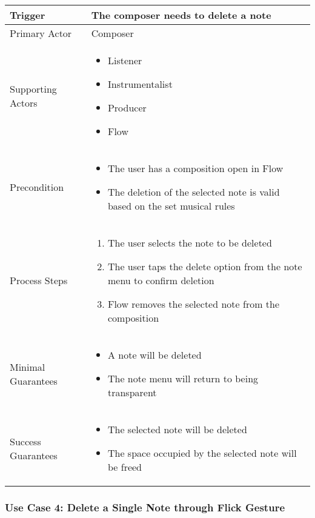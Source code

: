 \begin{tabularx}{\textwidth}{|X|X|}
\hline
Trigger & 
The composer needs to delete a note \\
\hline
Primary Actor & 
Composer\\
\hline
Supporting Actors & 
\begin{itemize}
\item Listener
\item Instrumentalist
\item Producer
\item Flow
\end{itemize} \\
\hline
Precondition & 
\begin{itemize}
\item The user has a composition open in Flow 
\item The deletion of the selected note is valid based on the set musical rules
\end{itemize} \\
\hline
Process Steps & 
\begin{enumerate}
\item The user selects the note to be deleted 
\item The user taps the delete option from the note menu to confirm deletion
\item Flow removes the selected note from the composition
\end{enumerate} \\
\hline
Minimal Guarantees & 
\begin{itemize}
  \item A note will be deleted
  \item The note menu will return to being transparent
\end{itemize} \\
\hline
Success Guarantees & 
\begin{itemize}
  \item The selected note will be deleted
  \item The space occupied by the selected note will be freed
\end{itemize} \\
\hline
\end{tabularx}

\subsubsection{Use Case 4: Delete a Single Note through Flick Gesture}

